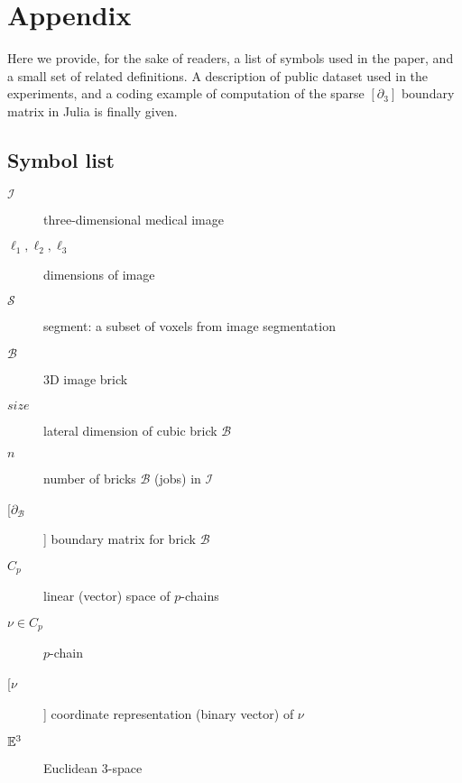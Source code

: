
\section{Appendix}

Here we provide, for the sake of readers, a list of symbols used in the paper, and a small set of related definitions. 
A description of public dataset used in the experiments, and 
a coding example of computation of the sparse $[\partial_3]$ boundary matrix in Julia is finally given.

\subsection{Symbol list}

\begin{description}
\item[$\mathcal{I}$]  three-dimensional medical image
\vspace{-2.5mm}\item[$\ell_1, \ell_2, \ell_3$]  dimensions of image
\vspace{-2.5mm}\item[$\mathcal{S}$]  segment: a subset of voxels from image segmentation
\vspace{-2.5mm}\item[$\mathcal{B}$] 3D image brick
\vspace{-2.5mm}\item[$size$] lateral dimension of cubic brick $\mathcal{B}$
\vspace{-2.5mm}\item[$n$]	number of bricks $\mathcal{B}$ (jobs) in $\mathcal{I}$
\vspace{-2.5mm}\item[[$\partial_\mathcal{B}$]]  boundary matrix for brick $\mathcal{B}$
\vspace{-2.5mm}\item[$C_p$] linear (vector) space of $p$-chains
\vspace{-2.5mm}\item[$\nu\in C_p$] $p$-chain
\vspace{-2.5mm}\item[[$\nu$]] coordinate representation (binary vector) of  $\nu$
\vspace{-2.5mm}\item[$\mathbb{E}^3$] Euclidean 3-space
\end{description}


